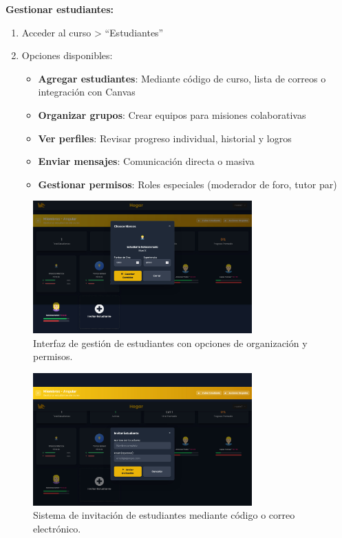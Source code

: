 \textbf{Gestionar estudiantes:}

\begin{enumerate}
	\item Acceder al curso > ``Estudiantes''
	\item Opciones disponibles:
	\begin{itemize}
		\item \textbf{Agregar estudiantes}: Mediante código de curso, lista de correos o integración con Canvas
		\item \textbf{Organizar grupos}: Crear equipos para misiones colaborativas
		\item \textbf{Ver perfiles}: Revisar progreso individual, historial y logros
		\item \textbf{Enviar mensajes}: Comunicación directa o masiva
		\item \textbf{Gestionar permisos}: Roles especiales (moderador de foro, tutor par)
	\end{itemize}
\end{enumerate}

\begin{figure}[H]
	\centering
	\includegraphics[width=0.75\textwidth]{images/pagina_web_gestionar-alumnos.jpg}
	\caption{Interfaz de gestión de estudiantes con opciones de organización y permisos.}
	\label{fig:manual-gestionar-alumnos}
\end{figure}

\begin{figure}[H]
	\centering
	\includegraphics[width=0.75\textwidth]{images/pagina_web_invitar-a-clase.jpg}
	\caption{Sistema de invitación de estudiantes mediante código o correo electrónico.}
	\label{fig:manual-invitar-clase}
\end{figure}

